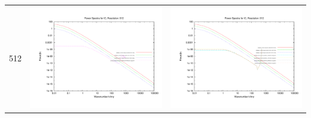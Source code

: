 \begin{itemize}
\begin{table}
\begin{tabular}{l|c|c}
 512 & \includegraphics[scale=0.2]{analysis/powerspectra/IC_powspec_combined_512_h70.pdf} & \includegraphics[scale=0.2]{analysis/powerspectra/IC_powspec_combined_512_h100.pdf} \\

 \end{tabular}
\end{table}


\end{itemize}
